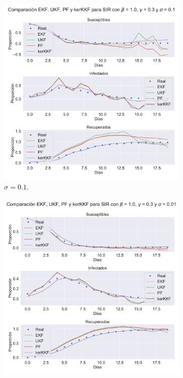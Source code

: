 \begin{figure}[h!]
    \centering
    \begin{subfigure}[b]{0.49\textwidth}
        \includegraphics[width=0.9\linewidth]{img/content/chapter4/nonlinear_filters_sir_sigma_01.pdf}
    \caption{$\sigma = 0.1$.}
    \label{fig:nonlinear_filters_sir_sigma_01}
    \end{subfigure}
    \begin{subfigure}[b]{0.49\textwidth}
        \includegraphics[width=0.9\linewidth]{img/content/chapter4/nonlinear_filters_sir_sigma_001.pdf}

\end{subfigure}
\end{figure}

